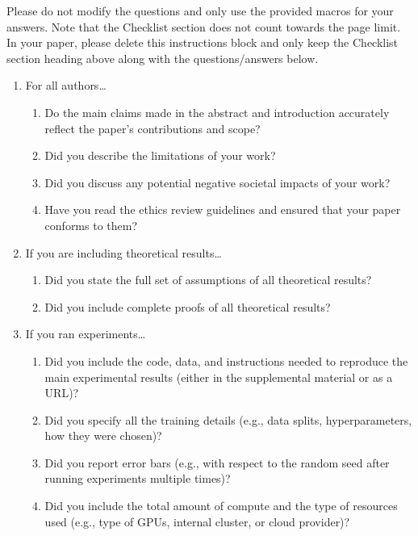 \documentclass{article}
\begin{document}
Please do not modify the questions and only use the provided macros for your
answers. Note that the Checklist section does not count towards the page
limit. In your paper, please delete this instructions block and only keep the
Checklist section heading above along with the questions/answers below.

\begin{enumerate}

\item For all authors\ldots
\begin{enumerate}
  \item Do the main claims made in the abstract and introduction accurately reflect the paper's contributions and scope?
    \answerTODO{}
  \item Did you describe the limitations of your work?
    \answerTODO{}
  \item Did you discuss any potential negative societal impacts of your work?
    \answerTODO{}
  \item Have you read the ethics review guidelines and ensured that your paper conforms to them?
    \answerTODO{}
\end{enumerate}

\item If you are including theoretical results\ldots
\begin{enumerate}
  \item Did you state the full set of assumptions of all theoretical results?
    \answerTODO{}
	\item Did you include complete proofs of all theoretical results?
    \answerTODO{}
\end{enumerate}

\item If you ran experiments\ldots
\begin{enumerate}
  \item Did you include the code, data, and instructions needed to reproduce
      the main experimental results (either in the supplemental material or as
      a URL)?
    \answerTODO{}
  \item Did you specify all the training details (e.g., data splits,
      hyperparameters, how they were chosen)?
    \answerTODO{}
    \item Did you report error bars (e.g., with respect to the random seed
        after running experiments multiple times)?
    \answerTODO{}
    \item Did you include the total amount of compute and the type of
        resources used (e.g., type of GPUs, internal cluster, or cloud
        provider)?
    \answerTODO{}
\end{enumerate}


\end{enumerate}
\end{document}
